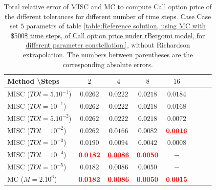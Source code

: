 \documentclass[11pt]{article}
\begin{document}
\begin{table}[h!]
	\centering
	\begin{tabular}{l*{6}{c}r}
		Method \textbackslash  Steps            & $2$ & $4$ & $8$ & $16$  \\
		\hline
		MISC ($TOl=5.10^{-1}$)  & $\mathbf{0.0262}$ & $\mathbf{0.0222}$ & $\mathbf{ 0.0218}$ & $\mathbf{ 0.0184}$  \\
		MISC ($TOl=10^{-1}$)  &  $\mathbf{0.0262}$ & $\mathbf{0.0222}$& $\mathbf{ 0.0218}$ & $\mathbf{ 0.0168}$   \\
		MISC ($TOl=5.10^{-2}$)  & $\mathbf{0.0262}$ & $\mathbf{0.0222}$ & $\mathbf{ 0.0218}$ & $\mathbf{ 0.0072}$  \\
		MISC ($TOl=10^{-2}$)  &  $\mathbf{0.0262}$ & $\mathbf{0.0166}$& $\mathbf{ 0.0082}$ & $\mathbf{ {\color{red}0.0016}}$  \\
		MISC ($TOl=10^{-3}$)  &  $\mathbf{0.0190}$ & $\mathbf{0.0094}$& $\mathbf{0.0042}$ & $\mathbf{ 0.0008}$  \\
		MISC ($TOl=10^{-4}$)  &  $\mathbf{{\color{red}0.0182}}$ & $\mathbf{{\color{red}0.0086}}$& $\mathbf{{\color{red}0.0050}}$ & $\mathbf{ -}$ \\
			MISC ($TOl=10^{-5}$)  &  $\mathbf{0.0182}$ & $\mathbf{0.0086}$& $\mathbf{0.0050}$ & $\mathbf{ -}$ 
			 \\
		\hline
		MC  ($M=2.10^6$)   & $\mathbf{{\color{red}0.0182}}$  & $\mathbf{ {\color{red}0.0086}}$  & $\mathbf{{\color{red}0.0050}}$ & $\mathbf{ {\color{red}0.0015}}$  \\		
		\hline
	\end{tabular}
	\caption{Total relative error of MISC and MC to compute Call option price of the different tolerances for different number of time steps. Case Case set $5$ parametrs of table \ref{table:Reference solution, using MC with $500$ time steps, of Call option price under rBergomi model, for different parameter constellation.}, without Richardson extrapolation. The numbers between parentheses are the corresponding absolute errors.}
	\label{Total error of MISC and MC to compute Call option price of the different tolerances for different number of time steps. Case set 5, without Richardson extrapolation. The numbers between parentheses are the corresponding absolute errors.}
\end{table}
\end{document}
